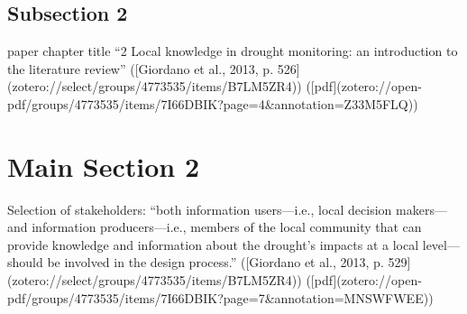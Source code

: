 
\subsection{Subsection 2}
paper chapter title
“2 Local knowledge in drought monitoring: an introduction to the literature review” ([Giordano et al., 2013, p. 526](zotero://select/groups/4773535/items/B7LM5ZR4)) ([pdf](zotero://open-pdf/groups/4773535/items/7I66DBIK?page=4&annotation=Z33M5FLQ))

\section{Main Section 2}

Selection of stakeholders:
“both information users—i.e., local decision makers—and information producers—i.e., members of the local community that can provide knowledge and information about the drought’s impacts at a local level—should be involved in the design process.” ([Giordano et al., 2013, p. 529](zotero://select/groups/4773535/items/B7LM5ZR4)) ([pdf](zotero://open-pdf/groups/4773535/items/7I66DBIK?page=7\&annotation=MNSWFWEE))

